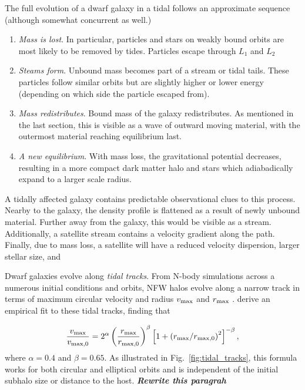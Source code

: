 The full evolution of a dwarf galaxy in a tidal follows an approximate
sequence (although somewhat concurrent as well.)

\begin{enumerate}
\def\labelenumi{\arabic{enumi}.}
\tightlist
\item
  \emph{Mass is lost}. In particular, particles and stars on weakly
  bound orbits are most likely to be removed by tides. Particles escape
  through \(L_1\) and \(L_2\)
\item
  \emph{Steams form}. Unbound mass becomes part of a stream or tidal
  tails. These particles follow similar orbits but are slightly higher
  or lower energy (depending on which side the particle escaped from).
\item
  \emph{Mass redistributes}. Bound mass of the galaxy redistributes. As
  mentioned in the last section, this is visible as a wave of outward
  moving material, with the outermost material reaching equilibrium
  last.
\item
  \emph{A new equilibrium}. With mass loss, the gravitational potential
  decreases, resulting in a more compact dark matter halo and stars
  which adiabadically expand to a larger scale radius.
\end{enumerate}

A tidally affected galaxy contains predictable observational clues to
this process. Nearby to the galaxy, the density profile is flattened as
a result of newly unbound material. Further away from the galaxy, this
would be visible as a stream. Additionally, a satellite stream contains
a velocity gradient along the path. Finally, due to mass loss, a
satellite will have a reduced velocity dispersion, larger stellar size,
and

Dwarf galaxies evolve along \emph{tidal tracks}. From N-body simulations
across a numerous initial conditions and orbits, NFW halos evolve along
a narrow track in terms of maximum circular velocity and radius
\(v_{\rm max}\) and \(r_{\rm max}\) . \citet{EN2021} derive an empirical
fit to these tidal tracks, finding that

\begin{equation}{
\frac{v_{\rm max}}{v_{\rm max, 0}} = 
2^\alpha 
\left(\frac{r_{\rm max}}{r_{\rm max, 0}}\right)^{\beta}\left[1 + \left(r_{\rm max} / r_{\rm max, 0}\right)^2\right]^{-\beta},
}\end{equation} where \(\alpha=0.4\) and \(\beta=0.65\). As illustrated
in Fig.~\ref{fig:tidal_tracks}, this formula works for both circular and
elliptical orbits and is independent of the initial subhalo size or
distance to the host. \textbf{\emph{Rewrite this paragrah}}

